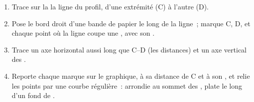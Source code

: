 \begin{method}
\begin{enumerate}
  \item Trace sur la  la ligne du profil, d'une extrémité (C) à
        l'autre (D).
  \item Pose le bord droit d'une bande de papier le long de la ligne~;
        marque C, D, et chaque point où la ligne coupe une , avec son .
  \item Trace un axe horizontal aussi long que C--D (les distances) et un
        axe vertical des .
  \item Reporte chaque marque sur le graphique, à sa distance de C et à son
        , et relie les points par une courbe régulière~: arrondie
        au sommet des , plate le long d'un fond de .
\end{enumerate}
\end{method}

